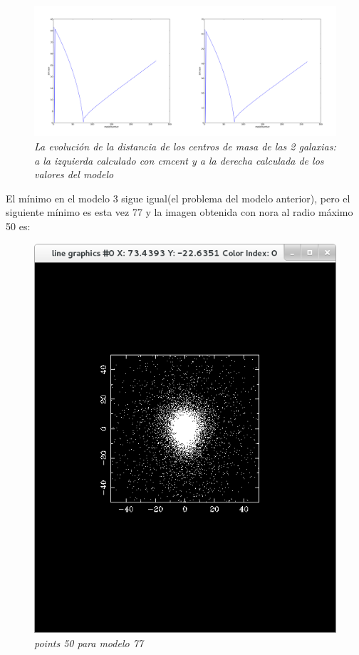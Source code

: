 \documentclass[12pt]{book}
\begin{document}
\begin{itemize}
\begin{figure}[!h]
 \centering
 \includegraphics[scale=0.2]{imgDistcon2Comb.png}
 \caption{\emph{La evolución de la distancia de los centros de masa de las 2 galaxias: a la izquierda calculado con cmcent y a la derecha calculada de los valores del modelo}}
 \label{Fig: 5}
\end{figure}
\end{itemize}

El mínimo en el modelo 3 sigue igual(el problema del modelo anterior), pero el siguiente mínimo es esta vez 77 y la imagen obtenida con nora al radio máximo 50 es:

\begin{figure}[!h]
 \centering
 \includegraphics[scale=0.5]{imgConModel77Points50.png}
 \caption{\emph{points 50 para modelo 77}}
 \label{Fig: 5}
\end{figure}
\end{document}
